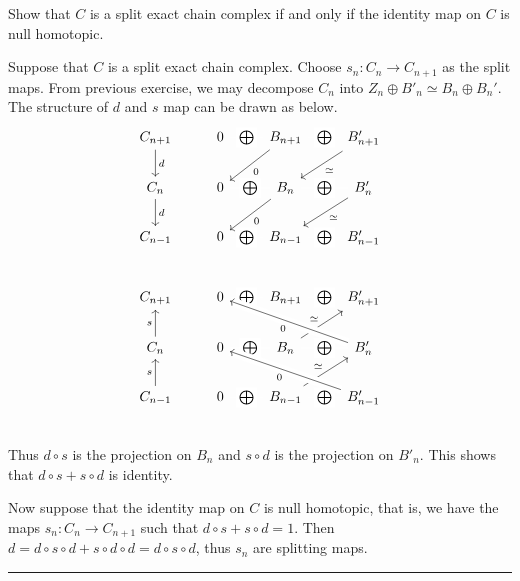 \begin{exer} Show that $C$ is a split exact chain complex if and only if the identity map on $C$ is null homotopic.
\end{exer}
\begin{solution} Suppose that $C$ is a split exact chain complex. Choose $s_n:C_n\rightarrow C_{n+1}$ as the split maps. From previous exercise, we may decompose $C_n$ into $Z_n\oplus B'_n\simeq B_n\oplus B_n'$. The structure of $d$ and $s$ map can be drawn as below.
\begin{equation}
\begin{tikzcd}
C_{n+1}\arrow{d}{d}&0\arrow[white, dash]{r}[black,description]{\bigoplus}&B_{n+1}\arrow[white, dash]{r}[black,description]{\bigoplus}\arrow{ld}{0}&B'_{n+1}\arrow{ld}{\simeq}\\
C_{n}\arrow{d}{d}&0\arrow[white, dash]{r}[black,description]{\bigoplus}&B_{n}\arrow[white, dash]{r}[black,description]{\bigoplus}\arrow{ld}{0}&B'_{n}\arrow{ld}{\simeq}\\
C_{n-1}&0\arrow[white, dash]{r}[black,description]{\bigoplus}&B_{n-1}\arrow[white, dash]{r}[black,description]{\bigoplus}&B'_{n-1}\\
\end{tikzcd}
\end{equation}
\begin{equation}
\begin{tikzcd}
C_{n+1}&0\arrow[white, dash]{r}[black,description]{\bigoplus}&B_{n+1}\arrow[white, dash]{r}[black,description]{\bigoplus}&B'_{n+1}\\
C_{n}\arrow{u}{s}&0\arrow[white, dash]{r}[black,description]{\bigoplus}&B_{n}\arrow[white, dash]{r}[black,description]{\bigoplus}\arrow{ur}{\simeq}&B'_{n}\arrow[ull, crossing over,"0"]\\
C_{n-1}\arrow{u}{s}&0\arrow[white, dash]{r}[black,description]{\bigoplus}&B_{n-1}\arrow[white, dash]{r}[black,description]{\bigoplus}\arrow{ur}{\simeq}&B'_{n-1}\arrow[ull, crossing over,"0"]\\
\end{tikzcd}
\end{equation}
Thus $d\circ s$ is the projection on $B_n$ and $s\circ d$ is the projection on $B'_n$. This shows that $d\circ s+s\circ d$ is identity.

Now suppose that the identity map on $C$ is null homotopic, that is, we have the maps $s_n:C_n\rightarrow C_{n+1}$ such that $d\circ s+s\circ d=1$. Then $d=d\circ s\circ d+s\circ d\circ d=d\circ s\circ d$, thus $s_n$ are splitting maps.
\end{solution}
\noindent\rule{\textwidth}{1pt}
\newline